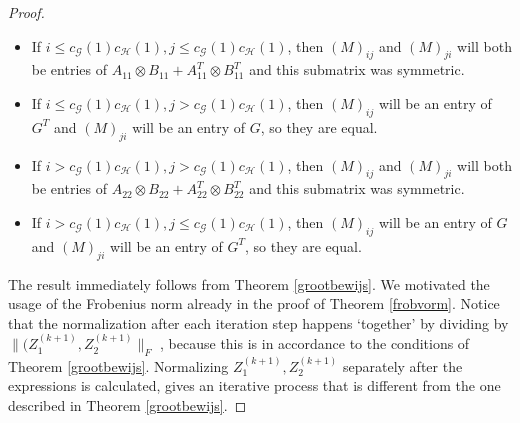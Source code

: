\documentclass[a4paper,11pt]{report}
\newcommand{\graf}{\mathscr{G}}
\newcommand{\grafeen}{\mathscr{H}}
\begin{document}
\begin{proof}
\begin{itemize}
  \item If $i \leq c_\graf(1)c_\grafeen(1), j \leq c_\graf(1)c_\grafeen(1)$, 
  then $(M)_{ij}$ and $(M)_{ji}$ will both be entries of $A_{11}\otimes B_{11} + A^T_{11}\otimes B^T_{11}$ and this submatrix was symmetric.
  \item If $i \leq c_\graf(1)c_\grafeen(1), j > c_\graf(1)c_\grafeen(1)$, then $(M)_{ij}$ 
  will be an entry of $G^T$ and $(M)_{ji}$ will be an entry of $G$, so they are 
  equal.
  \item If $i > c_\graf(1)c_\grafeen(1), j > c_\graf(1)c_\grafeen(1)$, then $(M)_{ij}$ and $(M)_{ji}$ will both be entries of $A_{22}\otimes B_{22} + A^T_{22}\otimes B^T_{22}$ and this submatrix was symmetric.
   \item If $i > c_\graf(1)c_\grafeen(1), j \leq c_\graf(1)c_\grafeen(1)$, then $(M)_{ij}$ 
  will be an entry of $G$ and $(M)_{ji}$ will be an entry of $G^T$, so they are 
  equal.
  \end{itemize}

The result immediately follows from Theorem \ref{grootbewijs}. We motivated the usage of the Frobenius norm
already in the proof of  Theorem \ref{frobvorm}. Notice that the normalization after each iteration step happens 
`together' by dividing by $\|(Z^{(k+1)}_1, Z^{(k+1)}_2\|_F$ , because this is in accordance to the conditions of Theorem \ref{grootbewijs}.
Normalizing $Z^{(k+1)}_1, Z^{(k+1)}_2$ separately after the expressions is 
calculated, gives an iterative process that is different from the one described 
in Theorem \ref{grootbewijs}.


\end{proof}
\end{document}
